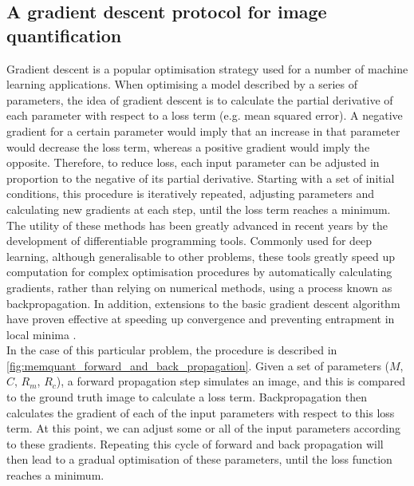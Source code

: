 \documentclass[12pt]{"report"}
\begin{document}
\subsection{A gradient descent protocol for image quantification}

Gradient descent is a popular optimisation strategy used for a number of machine learning applications. When optimising a model described by a series of parameters, the idea of gradient descent is to calculate the partial derivative of each parameter with respect to a loss term (e.g. mean squared error). A negative gradient for a certain parameter would imply that an increase in that parameter would decrease the loss term, whereas a positive gradient would imply the opposite. Therefore, to reduce loss, each input parameter can be adjusted in proportion to the negative of its partial derivative. Starting with a set of initial conditions, this procedure is iteratively repeated, adjusting parameters and calculating new gradients at each step, until the loss term reaches a minimum. \\

The utility of these methods has been greatly advanced in recent years by the development of differentiable programming tools. Commonly used for deep learning, although generalisable to other problems, these tools greatly speed up computation for complex optimisation procedures by automatically calculating gradients, rather than relying on numerical methods, using a process known as backpropagation. In addition, extensions to the basic gradient descent algorithm have proven effective at speeding up convergence and preventing entrapment in local minima \citep{Sun2019}. \\

In the case of this particular problem, the procedure is described in \cref{fig:memquant_forward_and_back_propagation}. Given a set of parameters ($M$, $C$, $R_m$, $R_c$), a forward propagation step simulates an image, and this is compared to the ground truth image to calculate a loss term. Backpropagation then calculates the gradient of each of the input parameters with respect to this loss term. At this point, we can adjust some or all of the input parameters according to these gradients. Repeating this cycle of forward and back propagation will then lead to a gradual optimisation of these parameters, until the loss function reaches a minimum. \\
\end{document}
